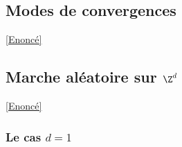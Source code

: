 \documentclass[8pt]{book}
\begin{document}
	\subsection{Modes de convergences}
	\label{Modes de convergences corrigé}
	\textcolor{blue}{\hyperref[Modes de convergences]{[Enoncé]}}\\
		
	\subsection{Marche aléatoire sur $\Z^d$ }
	\label{Marche aléatoire sur Z^d corrigé}
		\textcolor{blue}{\hyperref[Marche aléatoire sur Z^d]{[Enoncé]}}\\
	\subsubsection{Le cas $d=1$ }
\end{document}
